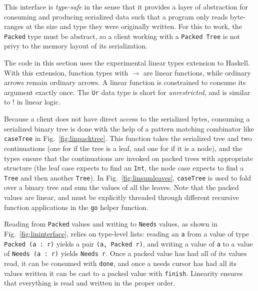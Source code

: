 \documentclass[showabstract,showacknowledgments,showpreface,showdedication,school]{iuphd}
\theoremstyle{nonumberplain}
\newcommand{\Figref}[1]{Fig.~\ref{#1}}
\newcommand{\il}[1]{\lstinline[style=inline,mathescape=true];#1;}
\begin{document}
This interface is \emph{type-safe} in the sense that it provides a layer
of abstraction for consuming and producing serialized data such that
a program only reads byte-ranges at the size and type they were originally
written. For this to work, the \il{Packed} type must be abstract, so
a client working with a \il{Packed Tree} is not privy to the memory
layout of its serialization.

The code in this section uses the experimental linear types extension to
Haskell. With this extension, function types with $\multimap$ are linear
functions, while ordinary arrows remain ordinary arrows. A linear function
is constrained to consume its argument exactly once. The \il{Ur} data type
is short for \emph{unrestricted}, and is similar to $!$ in linear logic.

Because a client does not have direct access to the serialized bytes,
consuming a serialized binary tree is done with the help of a pattern
matching combinator like \il{caseTree} in \Figref{fig:linpacktree}. This
function takes the serialized tree and two continuations (one for if the
tree is a leaf, and one for if it is a node), and the types ensure that
the continuations are invoked on packed trees with appropriate structure
(the leaf case expects to find an \il{Int}, the node case expects to
find a \il{Tree} and then another \il{Tree}).
In \Figref{fig:linsumleaves}, \il{caseTree} is used to fold over a binary
tree and sum the values of all the leaves. Note that the packed values are linear,
and must be explicitly threaded through different recursive function applications
in the \il{go} helper function.

Reading from \il{Packed} values and writing to \il{Needs} values, as shown in
\Figref{fig:lininterface}, relies on type-level lists: reading an \il{a} from
a value of type \il{Packed (a : r)} yields a pair \il{(a, Packed r)},
and writing a value of \il{a} to a value of \il{Needs (a : r)} yields
\il{Needs r}. Once a packed value has had all of its values read, it can
be consumed with \il{done}, and once a needs cursor has had all its values
written it can be cast to a packed value with \il{finish}. Linearity
ensures that everything is read and written in the proper order.
\end{document}
